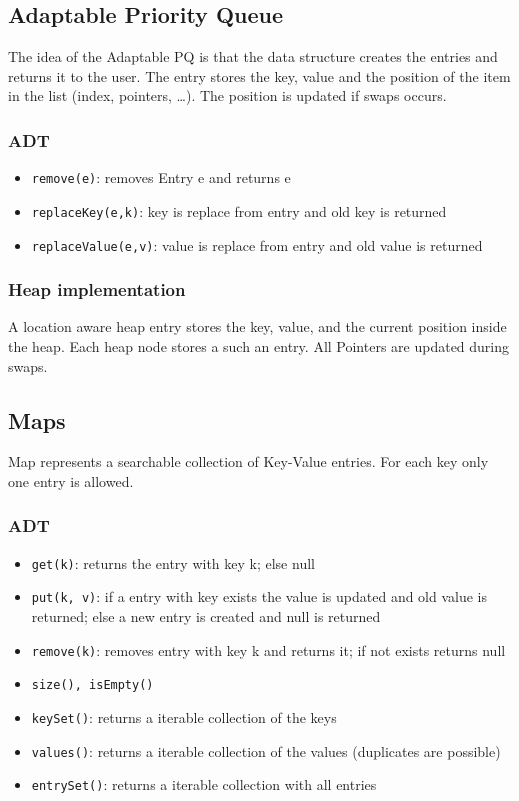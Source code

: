 \documentclass[11pt,twoside,landscape]{article}
\begin{document}
\begin{multicols}{2}
\subsection*{Adaptable Priority Queue}
\label{sec:org332c75c}
The idea of the Adaptable PQ is that the data structure creates the entries and returns it to the user. The entry stores the key, value and the position of the item in the list (index, pointers, \ldots{}). The position is updated if swaps occurs.
\subsubsection*{ADT}
\label{sec:org000567f}
\begin{itemize}
\item \texttt{remove(e)}: removes Entry e and returns e
\item \texttt{replaceKey(e,k)}: key is replace from entry and old key is returned
\item \texttt{replaceValue(e,v)}: value is replace from entry and old value is returned
\end{itemize}

\subsubsection*{Heap implementation}
\label{sec:org9cdbb62}
A location aware heap entry stores the key, value, and the current position inside the heap. Each heap node stores a such an entry. All Pointers are updated during swaps.

\subsection*{Maps}
\label{sec:org92f48d7}
Map represents a searchable collection of Key-Value entries. For each key only one entry is allowed.
\subsubsection*{ADT}
\label{sec:org18ce7d1}
\begin{itemize}
\item \texttt{get(k)}: returns the entry with key k; else null
\item \texttt{put(k, v)}: if a entry with key exists the value is updated and old value is returned; else a new entry is created and null is returned
\item \texttt{remove(k)}: removes entry with key k and returns it; if not exists returns null
\item \texttt{size(), isEmpty()}
\item \texttt{keySet()}: returns a iterable collection of the keys
\item \texttt{values()}: returns a iterable collection of the values (duplicates are possible)
\item \texttt{entrySet()}: returns a iterable collection with all entries
\end{itemize}



\end{multicols}
\end{document}

